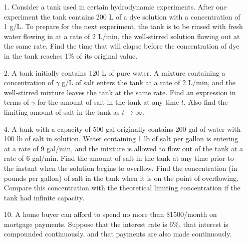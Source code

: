 \documentclass[9pt]{article}
\begin{document}
\begin{enumerate}
   \item[1.]   Consider a tank used in certain hydrodynamic experiments. After
               one experiment the tank contains 200 L of a dye solution with a
               concentration of 1 g/L. To prepare for the next experiment, the  
               tank is to be rinsed with fresh water flowing in at a rate of
               2 L/min, the well-stirred solution flowing out at the same rate. 
               Find the time that will elapse before the concentration of dye in 
               the tank reaches 1\% of its original value.
   \item[2.]   A tank initially contains 120 L of pure water. A mixture
               containing a concentration of $\gamma$ g/L of salt enters the
               tank at a rate of 2 L/min, and the well-stirred mixture leaves
               the tank at the same rate. Find an expression in terms of
               $\gamma$ for the amount of salt in the tank at any time $t$. Also
               find the limiting amount of salt in the tank as
               $t \rightarrow \infty$.
   \item[4.]   A tank with a capacity of 500 gal originally contains 200 gal of
               water with 100 lb of salt in solution. Water containing 1 lb of
               salt per gallon is entering at a rate of 9 gal/min, and the
               mixture is allowed to flow out of the tank at a rate of
               6 gal/min. Find the amount of salt in the tank at any time prior
               to the instant when the solution begins to overflow. Find the
               concentration (in pounds per gallon) of salt in the tank when it
               is on the point of overflowing. Compare this concentration with
               the theoretical limiting concentration if the tank had infinite
               capacity.
   \item[10.]  A home buyer can afford to spend no more than \$1500/month on
               mortgage payments. Suppose that the interest rate is 6\%, that
               interest is compounded continuously, and that payments are also
               made continuously.


\end{enumerate}
\end{document}
